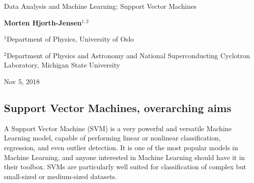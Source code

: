 \documentclass[%
oneside,                 %
final,                   %
10pt]{article}
\begin{document}

\newcommand{\exercisesection}[1]{\subsection*{#1}}






\thispagestyle{empty}

\begin{center}
{\LARGE\bf
\begin{spacing}{1.25}
Data Analysis and Machine Learning: Support Vector Machines
\end{spacing}
}
\end{center}


\begin{center}
{\bf Morten Hjorth-Jensen${}^{1, 2}$} \\ [0mm]
\end{center}

\begin{center}
\centerline{{\small ${}^1$Department of Physics, University of Oslo}}
\centerline{{\small ${}^2$Department of Physics and Astronomy and National Superconducting Cyclotron Laboratory, Michigan State University}}
\end{center}
    

\begin{center}
Nov 5, 2018
\end{center}

\vspace{1cm}


\subsection*{Support Vector Machines, overarching aims}

A Support Vector Machine (SVM) is a very powerful and versatile
Machine Learning model, capable of performing linear or nonlinear
classification, regression, and even outlier detection. It is one of
the most popular models in Machine Learning, and anyone interested in
Machine Learning should have it in their toolbox. SVMs are
particularly well suited for classification of complex but small-sized or
medium-sized datasets.  
\end{document}
